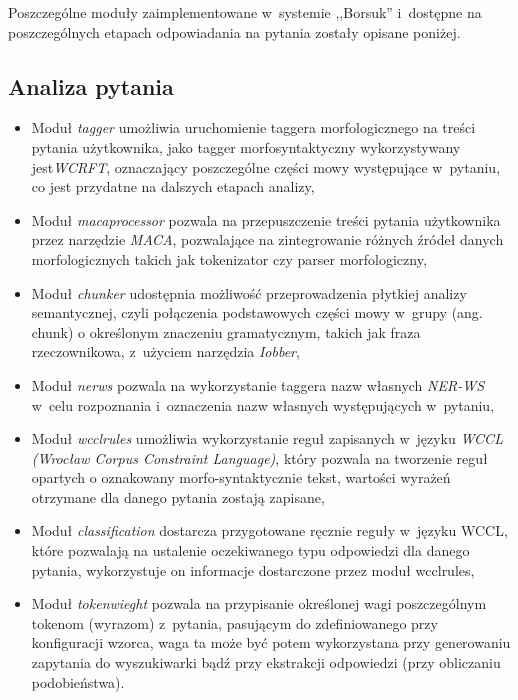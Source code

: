\documentclass[a4paper, twoside, 12pt]{report}
\begin{document}
        Poszczególne moduły zaimplementowane w~systemie ,,Borsuk'' i~dostępne na poszczególnych etapach odpowiadania na
        pytania zostały opisane poniżej.

        \subsection{Analiza pytania}
            \begin{itemize}
                \item Moduł \emph{tagger} umożliwia uruchomienie taggera morfologicznego na treści pytania użytkownika,
                    jako tagger morfosyntaktyczny wykorzystywany jest\emph{WCRFT}\cite{WCRFT}, oznaczający poszczególne części mowy występujące w~pytaniu,
                    co jest przydatne na dalszych etapach analizy,
                \item Moduł \emph{macaprocessor} pozwala na przepuszczenie treści pytania użytkownika przez narzędzie
                    \emph{MACA}\cite{MACA}, pozwalające na zintegrowanie różnych źródeł danych morfologicznych takich jak tokenizator
                    czy parser morfologiczny,
                \item Moduł \emph{chunker} udostępnia możliwość przeprowadzenia płytkiej analizy semantycznej, czyli połączenia
                    podstawowych części mowy w~grupy (ang. chunk) o określonym znaczeniu gramatycznym, takich jak
                    fraza rzeczownikowa, z~użyciem narzędzia \emph{Iobber},
                \item Moduł \emph{nerws} pozwala na wykorzystanie taggera nazw własnych \emph{NER-WS} w~celu rozpoznania
                    i~oznaczenia nazw własnych występujących w~pytaniu,
                \item Moduł \emph{wcclrules} umożliwia wykorzystanie reguł zapisanych w~języku
                    \emph{WCCL (Wrocław Corpus Constraint Language)}\cite{WCCL}, który pozwala na tworzenie reguł opartych o oznakowany
                    morfo-syntaktycznie tekst, wartości wyrażeń otrzymane dla danego pytania zostają zapisane,
               \item Moduł \emph{classification} dostarcza przygotowane ręcznie reguły w~języku WCCL, które pozwalają
                   na ustalenie oczekiwanego
                   typu odpowiedzi dla danego pytania, wykorzystuje on informacje dostarczone przez moduł wcclrules,
               \item Moduł \emph{tokenwieght} pozwala na przypisanie określonej wagi poszczególnym tokenom (wyrazom) z~pytania,
                   pasującym do zdefiniowanego przy konfiguracji wzorca, waga ta może być potem wykorzystana przy
                   generowaniu zapytania do wyszukiwarki bądź przy ekstrakcji odpowiedzi (przy obliczaniu podobieństwa).
            \end{itemize}
\end{document}
